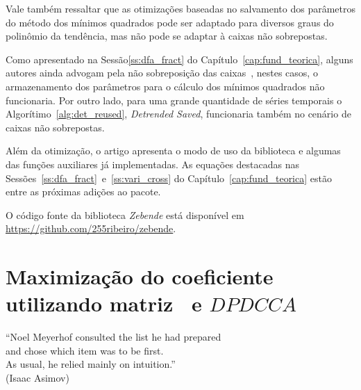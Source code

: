Vale também ressaltar que as otimizações baseadas no salvamento dos parâmetros do método dos mínimos quadrados pode ser adaptado para diversos graus do polinômio da tendência, mas não pode se adaptar à caixas não sobrepostas.

Como apresentado na Sessão\ref{ss:dfa_fract} do Capítulo~\ref{cap:fund_teorica}, alguns autores ainda advogam pela não sobreposição das caixas~\cite{zhouMultifractalDetrendedCrosscorrelation2008}, nestes casos, o armazenamento dos parâmetros para o cálculo dos mínimos quadrados não funcionaria. Por outro lado, para uma grande quantidade de séries temporais o Algorítimo~\ref{alg:det_reused}, \emph{Detrended Saved}, funcionaria também no cenário de caixas não sobrepostas.

Além da otimização, o artigo apresenta o modo de uso da biblioteca e algumas das funções auxiliares já implementadas. As equações destacadas nas Sessões~\ref{ss:dfa_fract}~e~\ref{ss:vari_cross} do Capítulo~\ref{cap:fund_teorica} estão entre as próximas adições ao pacote.

O código fonte da biblioteca \emph{Zebende} está disponível em \url{https://github.com/255ribeiro/zebende}.


    


\section{ Maximização do coeficiente \dmc utilizando matriz \pdcca~e $DPDCCA$}\label{sec:paper_03}



\begin{flushright}
    ``Noel Meyerhof consulted the list he had prepared \\
    and chose which item was to be first. \\
    As usual, he relied mainly on intuition.''\\[10px]
    (Isaac Asimov)
    \end{flushright}

